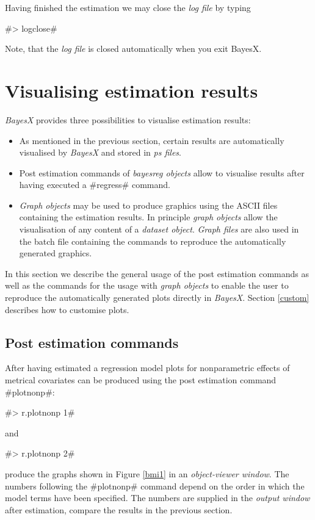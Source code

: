 \documentclass{article}
\begin{document}
Having finished the estimation we may close the {\it log file} by
typing

#> logclose#

Note, that the {\it log file} is closed automatically when you
exit BayesX.

\section{Visualising estimation results}\label{visual}

{\em BayesX} provides three possibilities to visualise estimation
results:
\begin{itemize}
\item As mentioned in the previous section, certain results are
automatically visualised by {\em BayesX} and stored in {\it ps
files}.
\item Post estimation commands of {\em bayesreg objects} allow to
visualise results after having executed a #regress# command.
\item {\em Graph objects} may be used to produce graphics using the ASCII files containing the estimation results.
In principle {\em graph objects} allow the visualisation of any
content of a {\em dataset object}. {\em Graph files} are also used
in the batch file containing the commands to reproduce the
automatically generated graphics.
\end{itemize}

In this section we describe the general usage of the post
estimation commands as well as the commands for the usage with
{\em graph objects} to enable the user to reproduce the
automatically generated plots directly in {\em BayesX}. Section
\ref{custom} describes how to customise plots.

\subsection{Post estimation commands}

After having estimated a regression model plots for nonparametric
effects of metrical covariates can be produced using the post
estimation command #plotnonp#:

#> r.plotnonp 1#

and

#> r.plotnonp 2#

produce the graphs shown in Figure \ref{bmi1} in an {\it
object-viewer window}. The numbers following the #plotnonp#
command depend on the order in which the model terms have been
specified. The numbers are supplied in the {\em output window}
after estimation, compare the results in the previous section.
\end{document}
